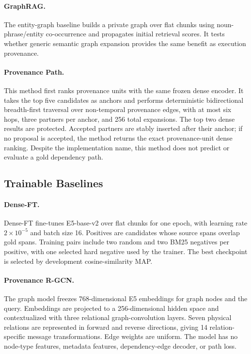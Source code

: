 \documentclass[sigconf,anonymous,review]{acmart}
\begin{document}
\paragraph{GraphRAG.}
The entity-graph baseline builds a private graph over flat chunks using noun-phrase/entity co-occurrence and propagates initial retrieval scores. It tests whether generic semantic graph expansion provides the same benefit as execution provenance.

\paragraph{Provenance Path.}
This method first ranks provenance units with the same frozen dense encoder. It takes the top five candidates as anchors and performs deterministic bidirectional breadth-first traversal over non-temporal provenance edges, with at most six hops, three partners per anchor, and 256 total expansions. The top two dense results are protected. Accepted partners are stably inserted after their anchor; if no proposal is accepted, the method returns the exact provenance-unit dense ranking. Despite the implementation name, this method does not predict or evaluate a gold dependency path.

\subsection{Trainable Baselines}

\paragraph{Dense-FT.}
Dense-FT fine-tunes E5-base-v2 over flat chunks for one epoch, with learning rate $2\times10^{-5}$ and batch size 16. Positives are candidates whose source spans overlap gold spans. Training pairs include two random and two BM25 negatives per positive, with one selected hard negative used by the trainer. The best checkpoint is selected by development cosine-similarity MAP.

\paragraph{Provenance R-GCN.}
The graph model freezes 768-dimensional E5 embeddings for graph nodes and the query. Embeddings are projected to a 256-dimensional hidden space and contextualized with three relational graph-convolution layers. Seven physical relations are represented in forward and reverse directions, giving 14 relation-specific message transformations. Edge weights are uniform. The model has no node-type features, metadata features, dependency-edge decoder, or path loss.
\end{document}
